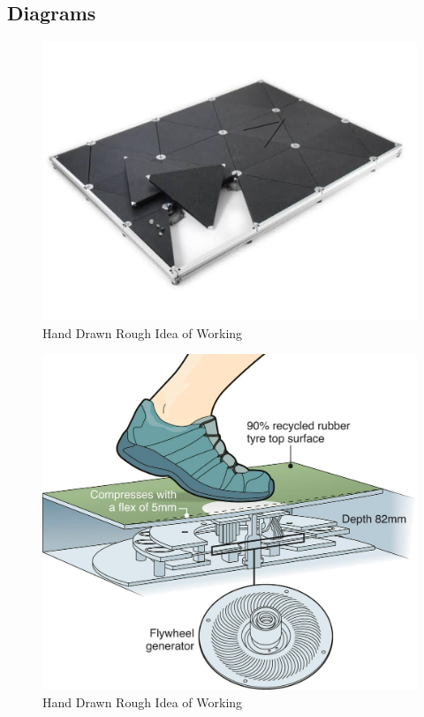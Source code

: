 \documentclass[11pt]{article}
\begin{document}
\subsection{Diagrams}
\begin{figure}[H]
	\centering
	\includegraphics[scale=0.3]{tiles.jpg}
	\caption{Hand Drawn Rough Idea of Working}
\end{figure}
\begin{figure}[H]
	\centering
	\includegraphics[scale=0.3]{internal.jpg}
	\caption{Hand Drawn Rough Idea of Working}
\end{figure}
\end{document}
